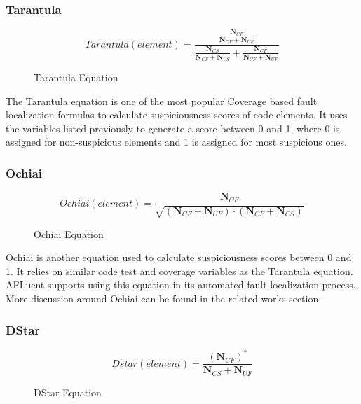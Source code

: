 
\subsubsection{Tarantula}
\label{subsubsec:Tarantula}
\begin{figure}[!htb]
	\begin{center}
		\begin{equation}
			Tarantula(element) = \frac{\frac{\textbf{N$_{CF}$}}{\textbf{N$_{CF}$} + \textbf{N$_{UF}$}}}{\frac{\textbf{N$_{CS}$}}{\textbf{N$_{CS}$}+\textbf{N$_{US}$}} + \frac{\textbf{N$_{CF}$}}{\textbf{N$_{CF}$}+\textbf{N$_{UF}$}}}
		\end{equation}
		\caption{\label{fig:tarantulaEquation} Tarantula Equation\cite{Jones2005TarantulaEval}}
	\end{center}
\end{figure}

The Tarantula equation is one of the most popular Coverage based fault localization
formulas to calculate suspiciousness scores of code elements. It uses the
variables listed previously to generate a score between 0 and 1, where 0 is
assigned for non-suspicious elements and 1 is assigned for most suspicious ones.

\subsubsection{Ochiai}
\label{subsubsec:Ochiai}
\begin{figure}[!htb]
	\begin{center}
		\begin{equation}
			Ochiai(element) = \frac{\textbf{N$_{CF}$}}{\sqrt{(\textbf{N$_{CF}$}  + \textbf{N$_{UF}$}) \cdot (\textbf{N$_{CF}$}  + \textbf{N$_{CS}$})}}
		\end{equation}
		\caption{\label{fig:ochiaiEquation} Ochiai Equation\cite{Abreu2006Ochiai}}
	\end{center}
\end{figure}

Ochiai is another equation used to calculate suspiciousness scores between 0 and
1. It relies on similar code test and coverage variables as the Tarantula
equation. AFLuent supports using this equation in its automated fault
localization process. More discussion around Ochiai can be found in the related
works section.

\subsubsection{DStar}
\label{subsubsec:DStar}
\begin{figure}[!htb]
	\begin{center}
		\begin{equation}
			Dstar(element) = \frac{(\textbf{N$_{CF}$})^{\ast}}{\textbf{N$_{CS}$} + \textbf{N$_{UF}$}}
		\end{equation}
		\caption{\label{fig:dstarEquation} DStar Equation\cite{Wong2014DStar}}
	\end{center}
\end{figure}


